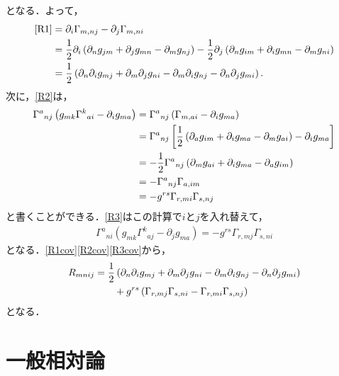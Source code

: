 \documentclass[a4paper]{ltjsreport}
\begin{document}
となる．よって，
\begin{align}
  \eqref{R1} &= \partial_i\Gamma_{m, nj} - \partial_j\Gamma_{m, ni}\notag\\
  &= \dfrac{1}{2}\partial_i\left(\partial_ng_{jm} + \partial_jg_{mn} - \partial_mg_{nj}\right) - \dfrac{1}{2}\partial_j\left(\partial_ng_{im} + \partial_ig_{mn} - \partial_mg_{ni}\right)\notag\\
  &= \dfrac{1}{2}\left(\partial_n\partial_ig_{mj} + \partial_m\partial_jg_{ni} - \partial_m\partial_ig_{nj} - \partial_n\partial_jg_{mi}\right).\label{R1cov}
\end{align}
次に，\eqref{R2}は，
\begin{align}
  {\Gamma^a}_{nj}\left(g_{mk}{\Gamma^k}_{ai} - \partial_ig_{ma}\right) &= {\Gamma^a}_{nj}\left(\Gamma_{m, ai} - \partial_ig_{ma}\right)\notag\\
  &= {\Gamma^a}_{nj}\left[\dfrac{1}{2}\left(\partial_ag_{im} + \partial_ig_{ma} - \partial_mg_{ai}\right) - \partial_ig_{ma}\right]\notag\\
  &= -  \dfrac{1}{2}{\Gamma^a}_{nj}\left(\partial_mg_{ai} + \partial_ig_{ma} - \partial_ag_{im}\right)\notag\\
  &= -  {\Gamma^a}_{nj}\Gamma_{a, im}\notag\\
  &= -  g^{rs}\Gamma_{r, mi}\Gamma_{s, nj}\label{R2cov}
\end{align}
と書くことができる．\eqref{R3}はこの計算で$i$と$j$を入れ替えて，
\begin{align}
  {\Gamma^a}_{ni}\left(g_{mk}{\Gamma^k}_{aj} - \partial_jg_{ma}\right) = -  g^{rs}\Gamma_{r, mj}\Gamma_{s, ni}\label{R3cov}
\end{align}
となる．\eqref{R1cov}\eqref{R2cov}\eqref{R3cov}から，
\begin{align*}
  R_{mnij} &= \dfrac{1}{2}\left(\partial_n\partial_ig_{mj} + \partial_m\partial_jg_{ni} - \partial_m\partial_ig_{nj} - \partial_n\partial_jg_{mi}\right)\notag\\
  &\qquad + g^{rs}\left(\Gamma_{r, mj}\Gamma_{s, ni} - \Gamma_{r, mi}\Gamma_{s, nj}\right)
\end{align*}
となる．

\chapter{一般相対論}
\setcounter{section}{1}
\end{document}
